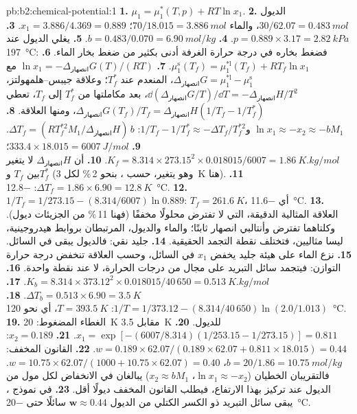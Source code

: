 \begin{solution}{pb:b2:chemical-potential:1}
\textbf{1.} $\mu_1 = \mu_1^*(T, p) + RT\ln x_1$.
\textbf{2.} الديول $30/62.07 = \qty{0.483}{mol}$، والماء $70/18.015 =
\qty{3.886}{mol}$؛ $x_1 = 3.886/4.369 = 0.889$.
\textbf{3.} $p = 0.889 \times 3.17 = \qty{2.82}{kPa}$.
\textbf{4.} $b = 0.483/0.070 = \qty{6.90}{mol/kg}$.
\textbf{5.} يغلي الديول عند \qty{197}{\celsius}: فضغط بخاره في درجة حرارة
الغرفة أدنى بكثير من ضغط بخار الماء.
\textbf{6.} $\mu_1^{\text{s}}(T_f) = \mu_1^{*\text{l}}(T_f) + RT_f\ln x_1$.
\textbf{7.} $\ln x_1 = -\Delta_{\text{انصهار}}G(T)/(RT)$ مع
$\Delta_{\text{انصهار}}G = \mu_1^{*\text{l}} - \mu_1^{\text{s}}$، المنعدم عند $T_f^*$؛
وعلاقة جيبس--هلمهولتز، $\dd(\Delta_{\text{انصهار}}G/T)/\dd T = -\Delta_{\text{انصهار}}H/T^2$،
بعد مكاملتها من $T_f^*$ إلى $T_f$، تعطي $\Delta_{\text{انصهار}}G(T_f)/T_f =
\Delta_{\text{انصهار}}H(1/T_f - 1/T_f^*)$، ومنها العلاقة.
\textbf{8.} $\ln x_1 \approx -x_2 \approx -bM_1$ و$1/T_f - 1/T_f^* \approx
-\Delta T_f/T_f^{*2}$: $\Delta T_f = (RT_f^{*2}M_1/\Delta_{\text{انصهار}}H)\,b$.
\textbf{9.} $333.4 \times 18.015 = \qty{6007}{J/mol}$؛ $K_f = 8.314 \times
273.15^2 \times 0.018015/6007 = \qty{1.86}{K.kg/mol}$.
\textbf{10.} أن $\Delta_{\text{انصهار}}H$ لا يتغير بين $T_f$ 
و$T_f^*$ (وهو يتغير، حسب ، بنحو 2\,\% لكل \qty{3}{K} هنا).
\textbf{11.} $\Delta T_f = 1.86 \times 6.90 = \qty{12.8}{K}$: \qty{-12.8}{\celsius}.
\textbf{12.} $1/T_f = 1/273.15 - (8.314/6007)\ln 0.889$: $T_f = \qty{261.6}{K}$،
أي \qty{-11.6}{\celsius}.
\textbf{13.} العلاقة المثالية الدقيقة، التي لا تفترض محلولًا مخففًا (فهنا
11\,\% من الجزيئات ديول). وكلتاهما تفترض 
وأنتالبي انصهار ثابتًا؛ والماء والديول، المرتبطان بروابط هيدروجينية،
ليسا مثاليين، فتختلف نقطة التجمد الحقيقية.
\textbf{14.} جليد نقي: فالديول يبقى في السائل.
\textbf{15.} نزع الماء على هيئة جليد يخفض $x_1$ في السائل، وحسب
العلاقة تنخفض درجة حرارة التوازن: فيتجمد سائل التبريد على مجال
من درجات الحرارة، لا عند نقطة واحدة.
\textbf{16.} $K_b = 8.314 \times 373.12^2 \times 0.018015/40\,650 =
\qty{0.513}{K.kg/mol}$.
\textbf{17.} $\Delta T_b = 0.513 \times 6.90 = \qty{3.5}{K}$.
\textbf{18.} $1/T = 1/373.12 - (8.314/40\,650)\ln(2.0/1.013)$: $T = \qty{393.5}{K}$،
أي نحو \qty{120}{\celsius}.
\textbf{19.} الغطاء المضغوط: \qty{20}{K} مقابل \qty{3.5}{K} للديول.
\textbf{20.} $x_1 = \exp[-(6007/8.314)(1/253.15 - 1/273.15)] = 0.811$.
\textbf{21.} $x_2 = 0.189$: $w = 0.189 \times 62.07/(0.189 \times 62.07 + 0.811
\times 18.015) = 0.44$.
\textbf{22.} القانون المخفف: $b = 20/1.86 = \qty{10.75}{mol/kg}$، $w = 10.75 \times
62.07/(1000 + 10.75 \times 62.07) = 0.40$. فالتقريبان الخطيان ($\ln x_1 \approx
-x_2$، $x_2 \approx bM_1$) يبالغان في الانخفاض لكل مول من الديول عند تركيز
بهذا الارتفاع، فيطلب القانون المخفف ديولًا أقل.
\textbf{23.} في نموذج ، يبقى سائل التبريد ذو الكسر الكتلي من
الديول $\boldsymbol{w \approx 0.44}$ سائلًا حتى \qty{-20}{\celsius}.
\end{solution}
